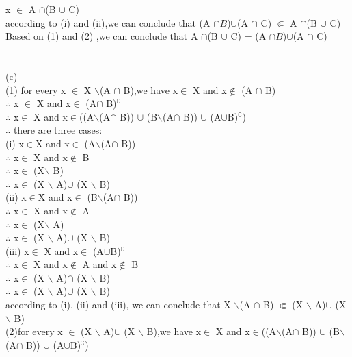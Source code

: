 \documentclass[11pt, a4paper, UTF8]{ctexart}
\begin{document}
\begin{solution}
\indent \indent x $\in$ A $\cap$(B $\cup$ C)\\
according to (i) and (ii),we can conclude that (A $\cap B$)$\cup$(A $\cap$ C) $\Subset$ A $\cap$(B $\cup$ C)\\
Based on (1) and (2) ,we can conclude that A $\cap$(B $\cup$ C) = (A $\cap B$)$\cup$(A $\cap$ C)\\
\\
\\
(c)\\
(1) for every x $\in$ X $\backslash$(A $\cap$ B),we have x$\in$ X and x$\notin$ (A $\cap$ B)\\
$\therefore$ x $\in$ X and x$\in$ (A$\cap$ B)$^\complement$\\
$\therefore$ x$\in$ X and x$\in$((A$\backslash$(A$\cap$ B)) $\cup$ (B$\backslash$(A$\cap$ B)) $\cup$ (A$\cup$B)$^\complement$)\\
$\therefore$ there are three cases:\\
\indent (i) x$\in$X and x$\in$ (A$\backslash$(A$\cap$ B))\\
\indent \indent $\therefore$ x$\in$ X and x$\notin$ B\\
\indent \indent $\therefore$ x$\in$ (X$\backslash$ B)\\
\indent \indent $\therefore$ x$\in$ (X $\backslash$ A)$\cup$ (X $\backslash$ B)\\
\indent (ii) x$\in$X and x$\in$ (B$\backslash$(A$\cap$ B))\\
\indent \indent $\therefore$ x$\in$ X and x$\notin$ A\\
\indent \indent $\therefore$ x$\in$ (X$\backslash$ A)\\
\indent \indent $\therefore$ x$\in$ (X $\backslash$ A)$\cup$ (X $\backslash$ B)\\
\indent (iii) x$\in$ X and x$\in$ (A$\cup$B)$^\complement$\\
\indent \indent $\therefore$ x$\in$ X and x$\notin$ A and x$\notin$ B\\
\indent \indent $\therefore$ x$\in$ (X $\backslash$ A)$\cap$ (X $\backslash$ B)\\
\indent \indent $\therefore$ x$\in$ (X $\backslash$ A)$\cup$ (X $\backslash$ B)\\
according to (i), (ii) and (iii), we can conclude that X $\backslash$(A $\cap$ B) $\Subset$ (X $\backslash$ A)$\cup$ (X $\backslash$ B)\\
(2)for every x $\in$ (X $\backslash$ A)$\cup$ (X $\backslash$ B),we have x$\in$ X and x$\in$((A$\backslash$(A$\cap$ B)) $\cup$ (B$\backslash$(A$\cap$ B)) $\cup$ (A$\cup$B)$^\complement$)\\

\end{solution}
\end{document}
